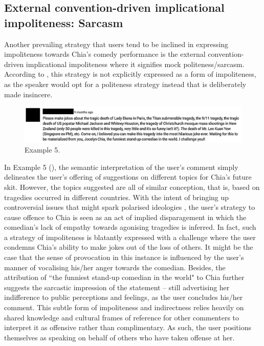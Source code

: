 \documentclass[english]{textolivre}
\begin{document}
\subsection{External convention-driven implicational impoliteness: Sarcasm}
Another prevailing strategy that users tend to be inclined in expressing impoliteness towards Chia’s comedy performance is the external convention-driven implicational impoliteness where it signifies mock politeness/sarcasm. According to \textcite{culpeper2005, culpeper2011}, this strategy is not explicitly expressed as a form of impoliteness, as the speaker would opt for a politeness strategy instead that is deliberately made insincere.

\begin{figure}[h!]
    \centering
    \begin{minipage}{0.90\linewidth}
    \includegraphics[width=\linewidth]{imagens/figura7.png}
    \caption{Example 5.}
    \label{example-5}
    \end{minipage}
\end{figure}

In Example 5 (), the semantic interpretation of the user’s comment simply delineates the user’s offering of suggestions on different topics for Chia’s future skit. However, the topics suggested are all of similar conception, that is, based on tragedies occurred in different countries. With the intent of bringing up controversial issues that might spark polarised ideologies \cite{tagg2017}, the user’s strategy to cause offence to Chia is seen as an act of implied disparagement in which the comedian’s lack of empathy towards agonising tragedies is inferred. In fact, such a strategy of impoliteness is blatantly expressed with a challenge where the user condemns Chia’s ability to make jokes out of the loss of others. It might be the case that the sense of provocation in this instance is influenced by the user’s manner of vocalising his/her anger towards the comedian. Besides, the attribution of ``the funniest stand-up comedian in the world" to Chia further suggests the sarcastic impression of the statement -- still advertising her indifference to public perceptions and feelings, as the user concludes his/her comment. This subtle form of impoliteness and indirectness relies heavily on shared knowledge and cultural frames of reference for other commenters to interpret it as offensive rather than complimentary. As such, the user positions themselves as speaking on behalf of others who have taken offense at her. 
\end{document}
